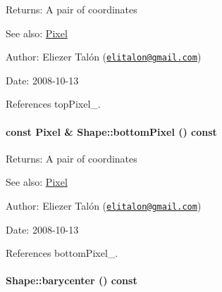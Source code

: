 \begin{Desc}
\item[Returns:]A pair of coordinates\end{Desc}
\begin{Desc}
\item[See also:]\hyperlink{_pixel_8hpp_535e59456e3e633842529cfa8ea103c4}{Pixel}\end{Desc}
\begin{Desc}
\item[Author:]Eliezer Talón (\href{mailto:elitalon@gmail.com}{\tt elitalon@gmail.com}) \end{Desc}
\begin{Desc}
\item[Date:]2008-10-13 \end{Desc}


References topPixel\_\-.\hypertarget{class_shape_99293804122214fa366d7f7ae794d077}{
\paragraph[bottomPixel]{\setlength{\rightskip}{0pt plus 5cm}const {\bf Pixel} \& Shape::bottomPixel () const}\hfill}
\label{class_shape_99293804122214fa366d7f7ae794d077}


\begin{Desc}
\item[Returns:]A pair of coordinates\end{Desc}
\begin{Desc}
\item[See also:]\hyperlink{_pixel_8hpp_535e59456e3e633842529cfa8ea103c4}{Pixel}\end{Desc}
\begin{Desc}
\item[Author:]Eliezer Talón (\href{mailto:elitalon@gmail.com}{\tt elitalon@gmail.com}) \end{Desc}
\begin{Desc}
\item[Date:]2008-10-13 \end{Desc}


References bottomPixel\_\-.\hypertarget{class_shape_a935b8870ea61569990b304b77513923}{
\paragraph[barycenter]{ Shape::barycenter () const}\hfill}
\label{class_shape_a935b8870ea61569990b304b77513923}


